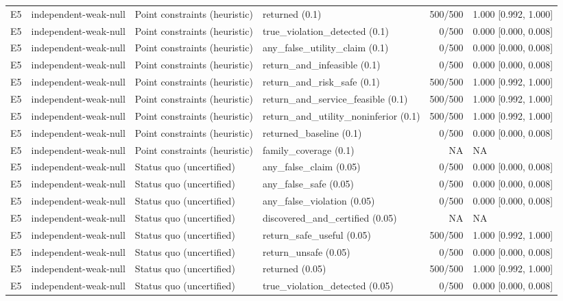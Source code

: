 \begin{longtable}{p{.04\linewidth}p{.18\linewidth}p{.19\linewidth}p{.16\linewidth}r p{.21\linewidth}}
E5 & independent-weak-null & Point constraints (heuristic) & returned (0.1) & 500/500 & 1.000 [0.992, 1.000]\\
E5 & independent-weak-null & Point constraints (heuristic) & true\_violation\_detected (0.1) & 0/500 & 0.000 [0.000, 0.008]\\
E5 & independent-weak-null & Point constraints (heuristic) & any\_false\_utility\_claim (0.1) & 0/500 & 0.000 [0.000, 0.008]\\
E5 & independent-weak-null & Point constraints (heuristic) & return\_and\_infeasible (0.1) & 0/500 & 0.000 [0.000, 0.008]\\
E5 & independent-weak-null & Point constraints (heuristic) & return\_and\_risk\_safe (0.1) & 500/500 & 1.000 [0.992, 1.000]\\
E5 & independent-weak-null & Point constraints (heuristic) & return\_and\_service\_feasible (0.1) & 500/500 & 1.000 [0.992, 1.000]\\
E5 & independent-weak-null & Point constraints (heuristic) & return\_and\_utility\_noninferior (0.1) & 500/500 & 1.000 [0.992, 1.000]\\
E5 & independent-weak-null & Point constraints (heuristic) & returned\_baseline (0.1) & 0/500 & 0.000 [0.000, 0.008]\\
E5 & independent-weak-null & Point constraints (heuristic) & family\_coverage (0.1) & NA & NA\\
E5 & independent-weak-null & Status quo (uncertified) & any\_false\_claim (0.05) & 0/500 & 0.000 [0.000, 0.008]\\
E5 & independent-weak-null & Status quo (uncertified) & any\_false\_safe (0.05) & 0/500 & 0.000 [0.000, 0.008]\\
E5 & independent-weak-null & Status quo (uncertified) & any\_false\_violation (0.05) & 0/500 & 0.000 [0.000, 0.008]\\
E5 & independent-weak-null & Status quo (uncertified) & discovered\_and\_certified (0.05) & NA & NA\\
E5 & independent-weak-null & Status quo (uncertified) & return\_safe\_useful (0.05) & 500/500 & 1.000 [0.992, 1.000]\\
E5 & independent-weak-null & Status quo (uncertified) & return\_unsafe (0.05) & 0/500 & 0.000 [0.000, 0.008]\\
E5 & independent-weak-null & Status quo (uncertified) & returned (0.05) & 500/500 & 1.000 [0.992, 1.000]\\
E5 & independent-weak-null & Status quo (uncertified) & true\_violation\_detected (0.05) & 0/500 & 0.000 [0.000, 0.008]\\

\end{longtable}
